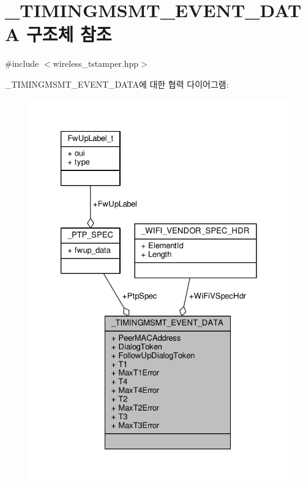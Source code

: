 \hypertarget{struct___t_i_m_i_n_g_m_s_m_t___e_v_e_n_t___d_a_t_a}{}\section{\+\_\+\+T\+I\+M\+I\+N\+G\+M\+S\+M\+T\+\_\+\+E\+V\+E\+N\+T\+\_\+\+D\+A\+TA 구조체 참조}
\label{struct___t_i_m_i_n_g_m_s_m_t___e_v_e_n_t___d_a_t_a}


{\ttfamily \#include $<$wireless\+\_\+tstamper.\+hpp$>$}



\+\_\+\+T\+I\+M\+I\+N\+G\+M\+S\+M\+T\+\_\+\+E\+V\+E\+N\+T\+\_\+\+D\+A\+T\+A에 대한 협력 다이어그램\+:
\nopagebreak
\begin{figure}[H]
\begin{center}
\leavevmode
\includegraphics[width=326pt]{struct___t_i_m_i_n_g_m_s_m_t___e_v_e_n_t___d_a_t_a__coll__graph}
\end{center}
\end{figure}
